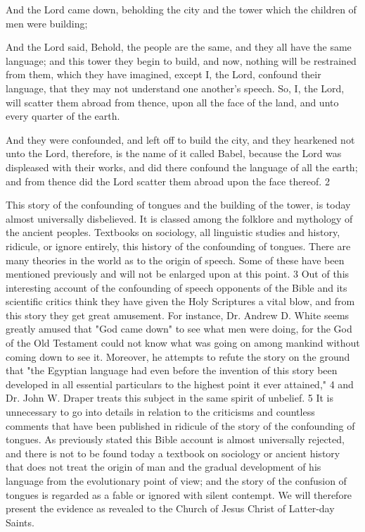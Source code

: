 And the Lord came down, beholding the city and the tower which the children of men were
building;

And the Lord said, Behold, the people are the same, and they all have the same language; and
this tower they begin to build, and now, nothing will be restrained from them, which they
have imagined, except I, the Lord, confound their language, that they may not understand one
another's speech. So, I, the Lord, will scatter them abroad from thence, upon all the face of
the land, and unto every quarter of the earth.

And they were confounded, and left off to build the city, and they hearkened not unto the
Lord, therefore, is the name of it called Babel, because the Lord was displeased with their
works, and did there confound the language of all the earth; and from thence did the Lord
scatter them abroad upon the face thereof. 2

This story of the confounding of tongues and the building of the tower, is today almost
universally disbelieved. It is classed among the folklore and mythology of the ancient
peoples. Textbooks on sociology, all linguistic studies and history, ridicule, or ignore
entirely, this history of the confounding of tongues. There are many theories in the world as
to the origin of speech. Some of these have been mentioned previously and will not be
enlarged upon at this point. 3 Out of this interesting account of the confounding of speech
opponents of the Bible and its scientific critics think they have given the Holy Scriptures a
vital blow, and from this story they get great amusement. For instance, Dr. Andrew D. White
seems greatly amused that "God came down" to see what men were doing, for the God of the
Old Testament could not know what was going on among mankind without coming down to
see it. Moreover, he attempts to refute the story on the ground that "the Egyptian language
had even before the invention of this story been developed in all essential particulars to the
highest point it ever attained," 4 and Dr. John W. Draper treats this subject in the same spirit
of unbelief. 5 It is unnecessary to go into details in relation to the criticisms and countless
comments that have been published in ridicule of the story of the confounding of tongues. As
previously stated this Bible account is almost universally rejected, and there is not to be
found today a textbook on sociology or ancient history that does not treat the origin of man
and the gradual development of his language from the evolutionary point of view; and the
story of the confusion of tongues is regarded as a fable or ignored with silent contempt. We
will therefore present the evidence as revealed to the Church of Jesus Christ of Latter-day
Saints.

